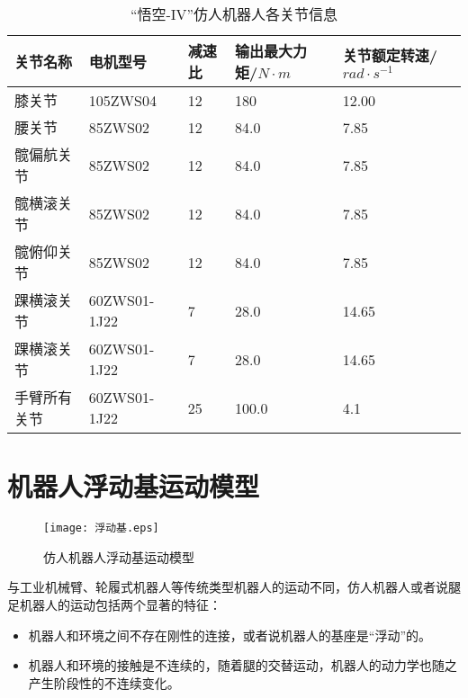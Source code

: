 \begin{table}[htbp]
	\centering
	\caption{“悟空-IV”仿人机器人各关节信息}
	\label{joint_motor}
	\begin{tabular}{m{3cm}<{\centering}m{3cm}<{\centering}m{1.5cm}<{\centering}m{2cm}<{\centering}m{2.5cm}<{\centering}}
		\toprule  %
		关节名称   &电机型号  &减速比  &输出最大力矩/$N \cdot m$ &关节额定转速/$rad\cdot s^{-1}$ \\
		\midrule  %
		膝关节 & 105ZWS04 & 12 & 180 & 12.00\\
		腰关节 & 85ZWS02 & 12 & 84.0 & 7.85\\        
		髋偏航关节 & 85ZWS02 & 12 & 84.0 & 7.85\\
		髋横滚关节 & 85ZWS02 & 12 & 84.0 & 7.85\\
		髋俯仰关节 & 85ZWS02 & 12 & 84.0 & 7.85\\
        踝横滚关节 & 60ZWS01-1J22 & 7 & 28.0 & 14.65\\
        踝横滚关节 & 60ZWS01-1J22 & 7 & 28.0 & 14.65\\
        手臂所有关节 & 60ZWS01-1J22 & 25 & 100.0 & 4.1\\
		\bottomrule %
	\end{tabular}
\end{table}
\section{机器人浮动基运动模型}
\label{sec:floating_base}
\begin{figure}[htbp]
    \centering
    \texttt{[image: 浮动基.eps]}
    \caption{\label{fig:floating_base}仿人机器人浮动基运动模型}
\end{figure}

与工业机械臂、轮履式机器人等传统类型机器人的运动不同，仿人机器人或者说腿足机器人的运动包括两个显著的特征：
\begin{itemize}
    \item 机器人和环境之间不存在刚性的连接，或者说机器人的基座是“浮动”的。
    \item 机器人和环境的接触是不连续的，随着腿的交替运动，机器人的动力学也随之产生阶段性的不连续变化。
\end{itemize}

